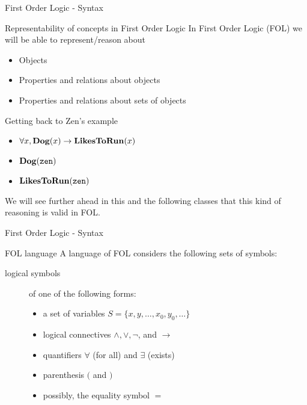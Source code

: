 \documentclass[aspectratio=169]{beamer}
\begin{document}
\begin{slide}{First Order Logic - Syntax}

 \begin{block}{Representability of concepts in First Order Logic}
 In First Order Logic (FOL) we will be able to represent/reason about
   \begin{itemize}
     \item Objects
     \item Properties and relations about objects
     \item Properties and relations about sets of objects
   \end{itemize}
 \end{block}
 
 \begin{block}{Getting back to Zen's example}
 \begin{itemize}
   \item $\forall x, {\bf Dog}(x) \to {\bf LikesToRun}(x)$
   \item ${\bf Dog}({\tt zen})$
   \item ${\bf LikesToRun}({\tt zen})$
 \end{itemize}
  We will see further ahead in this and the following classes that this kind of reasoning is valid in FOL.
 \end{block}
\end{slide}


\begin{slide}{First Order Logic - Syntax}
 
  \begin{block}{FOL language}  
    A language of FOL considers the following sets of symbols:
    \begin{description}
    \item [logical symbols] of one of the following forms:
    \begin{itemize}
      \item a set of variables $S = \{x,y,\ldots,x_0,y_0,\ldots\}$  
      \item logical connectives $\land, \lor, \neg$, and $\to$
      \item quantifiers $\forall$ (for all) and $\exists$ (exists)
      \item parenthesis $($ and $)$
      \item possibly, the equality symbol $=$
    \end{itemize}
    \end{description}
  \end{block}

\end{slide}
\end{document}
